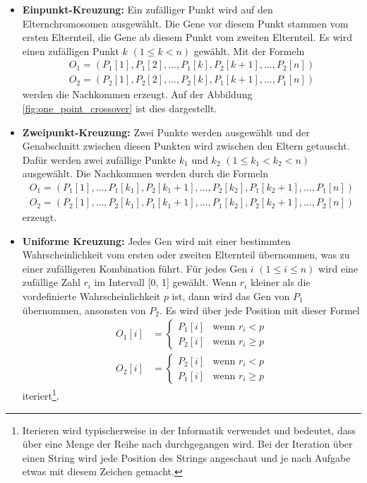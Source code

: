 \begin{itemize}
	\item \textbf{Einpunkt-Kreuzung:} Ein zufälliger Punkt wird auf den
	Elternchromosomen ausgewählt. Die Gene vor diesem Punkt stammen
	vom ersten Elternteil, die Gene ab diesem Punkt vom zweiten
	Elternteil. Es wird einen zufälligen Punkt \( k \) \((1 \leq k < n)\)
	gewählt. Mit der Formeln
	\begin{align*}
		O_1 = (P_1[1], P_1[2], \ldots, P_1[k], P_2[k+1], \ldots, P_2[n])\\
		O_2 = (P_2[1], P_2[2], \ldots, P_2[k], P_1[k+1], \ldots, P_1[n])
	\end{align*}
	werden die Nachkommen erzeugt. Auf der Abbildung \ref{fig:one_point_crossover}
	ist dies dargestellt.
	\item \textbf{Zweipunkt-Kreuzung:} Zwei Punkte werden ausgewählt und
	der Genabschnitt zwischen diesen Punkten wird zwischen den Eltern 
	getauscht. Dafür werden zwei zufällige Punkte \( k_1 \) und \( k_2 \)
	\((1 \leq k_1 < k_2 < n)\) ausgewählt. Die Nachkommen werden durch die
	Formeln
	\begin{align*}
		O_1 = (P_1[1], \ldots, P_1[k_1], P_2[k_1+1], \ldots, P_2[k_2], P_1[k_2+1], \ldots, P_1[n])\\
		O_2 = (P_2[1], \ldots, P_2[k_1], P_1[k_1+1], \ldots, P_1[k_2], P_2[k_2+1], \ldots, P_2[n])
	\end{align*}
	erzeugt.
	\item \textbf{Uniforme Kreuzung:} Jedes Gen wird mit einer bestimmten
	Wahrscheinlichkeit vom ersten oder zweiten Elternteil übernommen, was zu
	einer zufälligeren Kombination führt. Für jedes Gen \( i \) \((1 \leq i \leq n)\)
	wird eine zufällige Zahl \( r_i \) im Intervall [0, 1] gewählt. Wenn
	\( r_i \) kleiner als die vordefinierte Wahrscheinlichkeit \( p \) ist,
	dann wird das Gen von \( P_1 \) übernommen, ansonsten von \( P_2 \). Es
	wird über jede Position mit dieser Formel 
	\begin{align*}
		O_1[i] &=
		\begin{cases} 
			P_1[i] & \text{wenn } r_i < p       \\
			P_2[i] & \text{wenn } r_i \geq p 
		\end{cases}
		\\
		O_2[i] &=
		\begin{cases} 
			P_2[i] & \text{wenn } r_i < p       \\
			P_1[i] & \text{wenn } r_i \geq p 
		\end{cases}
	\end{align*}
	iteriert\footnote{
		Iterieren wird typischerweise in der Informatik verwendet und 
		bedeutet, dass über eine Menge der Reihe nach durchgegangen wird. 
		Bei der Iteration über einen String wird jede Position des Strings 
		angeschaut und je nach Aufgabe etwas mit diesem Zeichen gemacht.
		}.
\end{itemize}

